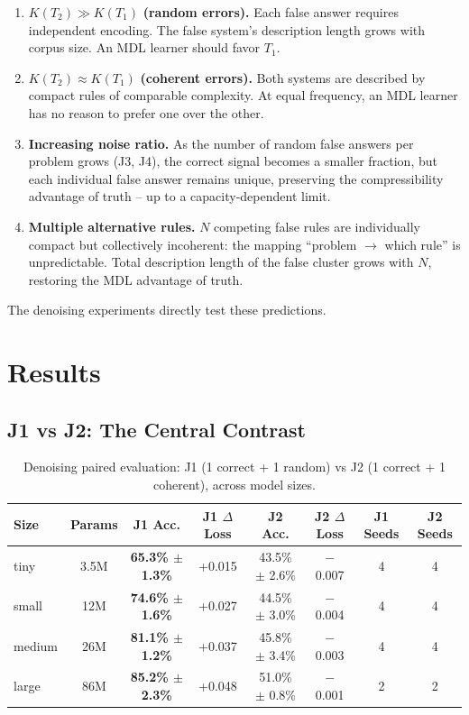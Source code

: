 \documentclass[10pt]{article} %
\begin{document}
\begin{enumerate}
    \item $K(T_2) \gg K(T_1)$ \textbf{(random errors).} Each false answer requires independent encoding. The false system's description length grows with corpus size. An MDL learner should favor $T_1$.

    \item $K(T_2) \approx K(T_1)$ \textbf{(coherent errors).} Both systems are described by compact rules of comparable complexity. At equal frequency, an MDL learner has no reason to prefer one over the other.

    \item \textbf{Increasing noise ratio.} As the number of random false answers per problem grows (J3, J4), the correct signal becomes a smaller fraction, but each individual false answer remains unique, preserving the compressibility advantage of truth -- up to a capacity-dependent limit.

    \item \textbf{Multiple alternative rules.} $N$ competing false rules are individually compact but collectively incoherent: the mapping ``problem $\to$ which rule'' is unpredictable. Total description length of the false cluster grows with $N$, restoring the MDL advantage of truth.
\end{enumerate}

The denoising experiments directly test these predictions.

\section{Results}
\label{sec:results}

\subsection{J1 vs J2: The Central Contrast}
\label{sec:j1j2}

\begin{table}[t]
\caption{Denoising paired evaluation: J1 (1 correct + 1 random) vs J2 (1 correct + 1 coherent), across model sizes.}
\label{tab:j1j2}
\centering
\begin{tabular}{lccccccc}
\toprule
Size & Params & J1 Acc. & J1 $\Delta$Loss & J2 Acc. & J2 $\Delta$Loss & J1 Seeds & J2 Seeds \\
\midrule
tiny & 3.5M & \textbf{65.3\% $\pm$ 1.3\%} & +0.015 & 43.5\% $\pm$ 2.6\% & $-$0.007 & 4 & 4 \\
small & 12M & \textbf{74.6\% $\pm$ 1.6\%} & +0.027 & 44.5\% $\pm$ 3.0\% & $-$0.004 & 4 & 4 \\
medium & 26M & \textbf{81.1\% $\pm$ 1.2\%} & +0.037 & 45.8\% $\pm$ 3.4\% & $-$0.003 & 4 & 4 \\
large & 86M & \textbf{85.2\% $\pm$ 2.3\%} & +0.048 & 51.0\% $\pm$ 0.8\% & $-$0.001 & 2 & 2 \\
\bottomrule
\end{tabular}
\end{table}
\end{document}
